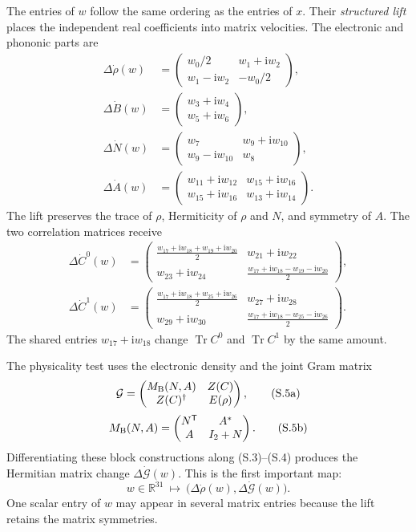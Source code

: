\documentclass[10pt,letterpaper,twocolumn]{article}
\newcommand{\R}{\mathbb R}
\newcommand{\ii}{\mathrm i}
\begin{document}
The entries of \(w\) follow the same ordering as the entries of \(x\).  Their
\emph{structured lift} places the independent real coefficients into matrix
velocities.  The electronic and phononic parts are
{\footnotesize
\[
\begin{aligned}
\Delta\dot\rho(w)&=
\begin{pmatrix}
w_0/2&w_1+\ii w_2\\
w_1-\ii w_2&-w_0/2
\end{pmatrix},\\
\Delta\dot B(w)&=
\begin{pmatrix}w_3+\ii w_4\\w_5+\ii w_6\end{pmatrix},\\
\Delta\dot N(w)&=
\begin{pmatrix}
w_7&w_9+\ii w_{10}\\
w_9-\ii w_{10}&w_8
\end{pmatrix},\\
\Delta\dot A(w)&=
\begin{pmatrix}
w_{11}+\ii w_{12}&w_{15}+\ii w_{16}\\
w_{15}+\ii w_{16}&w_{13}+\ii w_{14}
\end{pmatrix}.
\end{aligned}
\tag{S.3}
\]
}
The lift preserves the trace of \(\rho\), Hermiticity of \(\rho\) and
\(N\), and symmetry of \(A\).  The two correlation matrices receive
{\scriptsize
\[
\begin{aligned}
\Delta\dot C^0(w)&=
\begin{pmatrix}
\frac{w_{17}+\ii w_{18}+w_{19}+\ii w_{20}}2&w_{21}+\ii w_{22}\\
w_{23}+\ii w_{24}&\frac{w_{17}+\ii w_{18}-w_{19}-\ii w_{20}}2
\end{pmatrix},\\[2pt]
\Delta\dot C^1(w)&=
\begin{pmatrix}
\frac{w_{17}+\ii w_{18}+w_{25}+\ii w_{26}}2&w_{27}+\ii w_{28}\\
w_{29}+\ii w_{30}&\frac{w_{17}+\ii w_{18}-w_{25}-\ii w_{26}}2
\end{pmatrix}.
\end{aligned}
\tag{S.4}
\]
}
The shared entries \(w_{17}+\ii w_{18}\) change
\(\operatorname{Tr}C^0\) and \(\operatorname{Tr}C^1\) by the same amount.

The physicality test uses the electronic density and the joint Gram matrix
\[
\mathcal G=
\begin{pmatrix}
M_{\rm B}(N,A)&Z(C)\\
Z(C)^\dagger&E(\rho)
\end{pmatrix},
\tag{S.5a}
\]
\[
M_{\rm B}(N,A)=
\begin{pmatrix}
N^{\mathsf T}&A^*\\
A&I_2+N
\end{pmatrix}.
\tag{S.5b}
\]
Differentiating these block constructions along (S.3)--(S.4) produces the
Hermitian matrix change \(\Delta\dot{\mathcal G}(w)\).  This is the first
important map:
\[
w\in\R^{31}
\ \longmapsto\
\bigl(\Delta\dot\rho(w),\Delta\dot{\mathcal G}(w)\bigr).
\tag{S.6}
\]
One scalar entry of \(w\) may appear in several matrix entries because the
lift retains the matrix symmetries.
\end{document}
